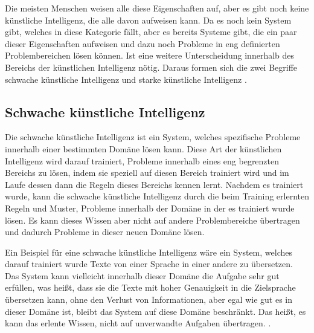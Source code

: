 Die meisten Menschen weisen alle diese Eigenschaften auf, aber 
es gibt noch keine künstliche Intelligenz, die alle davon 
aufweisen kann. Da es noch kein System gibt, welches in diese Kategorie 
fällt, aber es bereits Systeme gibt, die ein paar dieser Eigenschaften
aufweisen und dazu noch Probleme in eng definierten Problembereichen lösen 
können. Ist eine weitere Unterscheidung innerhalb des Bereichs der 
künstlichen Intelligenz nötig. Daraus formen sich die zwei Begriffe 
schwache künstliche Intelligenz und starke künstliche Intelligenz \cite[S. 5-7]{lanquillonKnowledgeScienceGrundlagen2023}.


\subsection{Schwache künstliche Intelligenz}
Die schwache künstliche 
Intelligenz ist ein System, welches spezifische Probleme innerhalb einer bestimmten 
Domäne lösen kann. Diese Art der künstlichen Intelligenz wird darauf trainiert, 
Probleme innerhalb eines eng begrenzten Bereichs zu lösen, indem sie speziell auf 
diesen Bereich trainiert wird und im Laufe dessen dann die Regeln dieses Bereichs 
kennen lernt. Nachdem es trainiert wurde, kann die schwache künstliche Intelligenz 
durch die beim Training erlernten Regeln und Muster, Probleme innerhalb der Domäne 
in der es trainiert wurde lösen. Es kann dieses Wissen aber nicht auf andere 
Problembereiche übertragen und dadurch Probleme in dieser neuen Domäne lösen.\par
Ein Beispiel für eine schwache künstliche Intelligenz wäre ein System, welches 
darauf trainiert wurde Texte von einer Sprache in einer andere zu übersetzen. 
Das System kann vielleicht innerhalb dieser Domäne die Aufgabe sehr gut erfüllen, 
was heißt, dass sie die Texte mit hoher Genauigkeit in die Zielsprache übersetzen 
kann, ohne den Verlust von Informationen, aber egal wie gut es in dieser Domäne 
ist, bleibt das System auf diese Domäne beschränkt. Das heißt, es kann
das erlente Wissen, nicht auf unverwandte Aufgaben übertragen. 
\cite{lanquillonKnowledgeScienceGrundlagen2023}.

